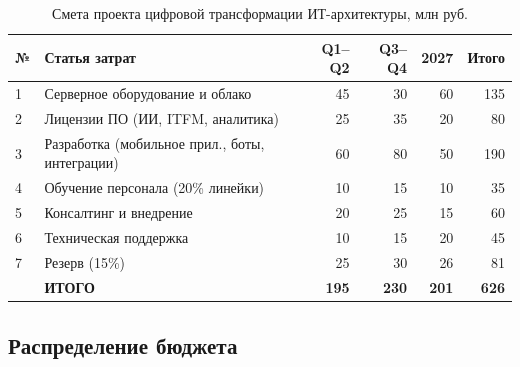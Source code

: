 \documentclass[12pt,a4paper]{article}
\begin{document}
\begin{table}[H]
\centering
\caption{Смета проекта цифровой трансформации ИТ-архитектуры, млн руб.}
\label{tab:budget}
\small
\begin{tabularx}{\textwidth}{|l|X|r|r|r|r|}
\hline
\rowcolor{samoletlight}
\textbf{№} & \textbf{Статья затрат} & \textbf{Q1--Q2} & \textbf{Q3--Q4} & \textbf{2027} & \textbf{Итого} \\
\hline
1 & Серверное оборудование и облако & 45 & 30 & 60 & 135 \\
\hline
2 & Лицензии ПО (ИИ, ITFM, аналитика) & 25 & 35 & 20 & 80 \\
\hline
3 & Разработка (мобильное прил., боты, интеграции) & 60 & 80 & 50 & 190 \\
\hline
4 & Обучение персонала (20\% линейки) & 10 & 15 & 10 & 35 \\
\hline
5 & Консалтинг и внедрение & 20 & 25 & 15 & 60 \\
\hline
6 & Техническая поддержка & 10 & 15 & 20 & 45 \\
\hline
7 & Резерв (15\%) & 25 & 30 & 26 & 81 \\
\hline
\rowcolor{samoletlight}
  & \textbf{ИТОГО} & \textbf{195} & \textbf{230} & \textbf{201} & \textbf{626} \\
\hline
\end{tabularx}
\end{table}

\subsection{Распределение бюджета}
\end{document}
